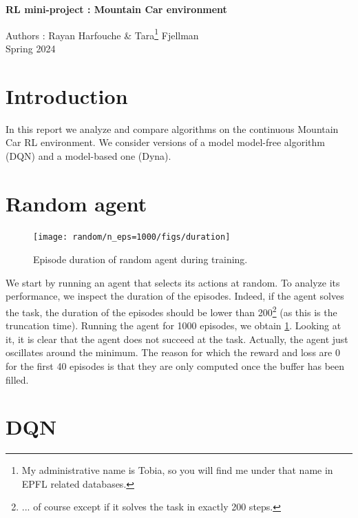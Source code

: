 \documentclass[a4paper, 12pt,oneside]{article}
\begin{document}
 
	\begin{center}
	    \Large
	    \textbf{RL mini-project : Mountain Car environment}
	        
	    \vspace{0.4cm}
	    \large
	    Authors : Rayan Harfouche \& Tara\footnote[1]{My administrative name is Tobia, so you will find me under that name in EPFL related databases.} Fjellman \\
	    \small{Spring 2024}
	\end{center}

    \section{Introduction}
        In this report we analyze and compare algorithms on the continuous Mountain Car RL environment. We consider versions of a model model-free algorithm (DQN) and a model-based one (Dyna). 
    \section{Random agent}
    \begin{figure}
        \centering
        \vspace{-3em}
        \texttt{[image: random/n\_eps=1000/figs/duration]}
        \caption{Episode duration of random agent during training.}
        \label{fig:random-neps=1000}
    \end{figure}
    We start by running an agent that selects its actions at random. To analyze its performance, we inspect the duration of the episodes. Indeed, if the agent solves the task, the duration of the episodes should be lower than 200\footnote[2]{... of course except if it solves the task in exactly 200 steps.} (as this is the truncation time).
    Running the agent for 1000 episodes, we obtain \ref{fig:random-neps=1000}. Looking at it, it is clear that the agent does not succeed at the task. Actually, the agent just oscillates around the minimum. The reason for which the reward and loss are 0 for the first 40 episodes is that they are only computed once the buffer has been filled.  
    \section{DQN}
\end{document}
